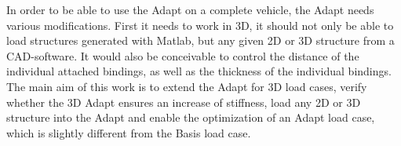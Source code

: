 In order to be able to use the Adapt on a complete vehicle,
the Adapt needs various modifications. First it needs
to work in 3D, it should not only be able to load
structures generated with Matlab, but any given 2D or
3D structure from a CAD-software. It would also be
conceivable to control the distance of the individual
attached bindings, as well as the thickness of the individual bindings.\\

The main aim of this work is to extend the Adapt for 3D load cases,
verify whether the 3D Adapt ensures an increase
of stiffness, load any 2D or 3D structure into the Adapt and enable
the optimization of an Adapt load case, which is slightly different from
the Basis load case.



